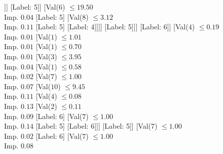 \documentclass[margin=10pt]{standalone}
\begin{document}
\begin{forest}[Val($10$) $ \leq 10.35$ \\ Imp. $0.06$
	[Val($6$) $ \leq 94.50$ \\ Imp. $0.03$
		[Val($9$) $ \leq 0.56$ \\ Imp. $0.02$
			[Val($10$) $ \leq 9.07$ \\ Imp. $0.01$
				[Label: 4]
				[Val($9$) $ \leq 0.47$ \\ Imp. $0.01$
					[Val($6$) $ \leq 88.50$ \\ Imp. $0.03$
						[Val($9$) $ \leq 0.35$ \\ Imp. $0.04$
							[Label: 4]
							[Val($6$) $ \leq 33.50$ \\ Imp. $0.01$
								[Val($1$) $ \leq 0.69$ \\ Imp. $0.02$
									[Val($9$) $ \leq 0.45$ \\ Imp. $0.02$
										[Val($7$) $ \leq 0.99$ \\ Imp. $0.03$
											[Label: 5]
											[Val($7$) $ \leq 1.00$ \\ Imp. $0.17$
												[Label: 6]
												[Label: 5]]]
										[Label: 5]]
									[Val($6$) $ \leq 19.50$ \\ Imp. $0.04$
										[Label: 5]
										[Val($8$) $ \leq 3.12$ \\ Imp. $0.11$
											[Label: 5]
											[Label: 4]]]]
								[Label: 5]]]
						[Label: 6]]
					[Val($4$) $ \leq 0.19$ \\ Imp. $0.01$
						[Val($1$) $ \leq 1.01$ \\ Imp. $0.01$
							[Val($1$) $ \leq 0.70$ \\ Imp. $0.01$
								[Val($3$) $ \leq 3.95$ \\ Imp. $0.04$
									[Val($1$) $ \leq 0.58$ \\ Imp. $0.02$
										[Val($7$) $ \leq 1.00$ \\ Imp. $0.07$
											[Val($10$) $ \leq 9.45$ \\ Imp. $0.11$
												[Val($4$) $ \leq 0.08$ \\ Imp. $0.13$
													[Val($2$) $ \leq 0.11$ \\ Imp. $0.09$
														[Label: 6]
														[Val($7$) $ \leq 1.00$ \\ Imp. $0.14$
															[Label: 5]
															[Label: 6]]]
													[Label: 5]]
												[Val($7$) $ \leq 1.00$ \\ Imp. $0.02$
													[Label: 6]
													[Val($7$) $ \leq 1.00$ \\ Imp. $0.08$

\end{forest}
\end{document}
